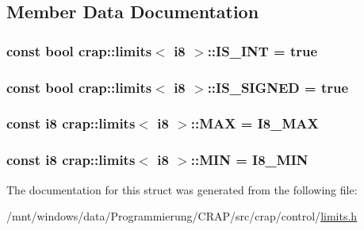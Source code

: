 \subsection{Member Data Documentation}
\hypertarget{structcrap_1_1limits_3_01i8_01_4_a51f3d21ce69742a7573fccdefbcd850a}{
\subsubsection[{I\-S\-\_\-\-I\-N\-T}]{\setlength{\rightskip}{0pt plus 5cm}const bool {\bf crap\-::limits}$<$ {\bf i8} $>$\-::I\-S\-\_\-\-I\-N\-T = true\hspace{0.3cm}{\ttfamily [static]}}}\label{structcrap_1_1limits_3_01i8_01_4_a51f3d21ce69742a7573fccdefbcd850a}
\hypertarget{structcrap_1_1limits_3_01i8_01_4_aaaca3b4f389d55b8d647c522f13c1c37}{
\subsubsection[{I\-S\-\_\-\-S\-I\-G\-N\-E\-D}]{\setlength{\rightskip}{0pt plus 5cm}const bool {\bf crap\-::limits}$<$ {\bf i8} $>$\-::I\-S\-\_\-\-S\-I\-G\-N\-E\-D = true\hspace{0.3cm}{\ttfamily [static]}}}\label{structcrap_1_1limits_3_01i8_01_4_aaaca3b4f389d55b8d647c522f13c1c37}
\hypertarget{structcrap_1_1limits_3_01i8_01_4_a9a112176e132c99e9a942394b144358d}{
\subsubsection[{M\-A\-X}]{\setlength{\rightskip}{0pt plus 5cm}const {\bf i8} {\bf crap\-::limits}$<$ {\bf i8} $>$\-::M\-A\-X = {\bf I8\-\_\-\-M\-A\-X}\hspace{0.3cm}{\ttfamily [static]}}}\label{structcrap_1_1limits_3_01i8_01_4_a9a112176e132c99e9a942394b144358d}
\hypertarget{structcrap_1_1limits_3_01i8_01_4_af0166184f7c1640d6c55d91aec23122c}{
\subsubsection[{M\-I\-N}]{\setlength{\rightskip}{0pt plus 5cm}const {\bf i8} {\bf crap\-::limits}$<$ {\bf i8} $>$\-::M\-I\-N = {\bf I8\-\_\-\-M\-I\-N}\hspace{0.3cm}{\ttfamily [static]}}}\label{structcrap_1_1limits_3_01i8_01_4_af0166184f7c1640d6c55d91aec23122c}


The documentation for this struct was generated from the following file\-:\begin{DoxyCompactItemize}
\item 
/mnt/windows/data/\-Programmierung/\-C\-R\-A\-P/src/crap/control/\hyperlink{limits_8h}{limits.\-h}\end{DoxyCompactItemize}
